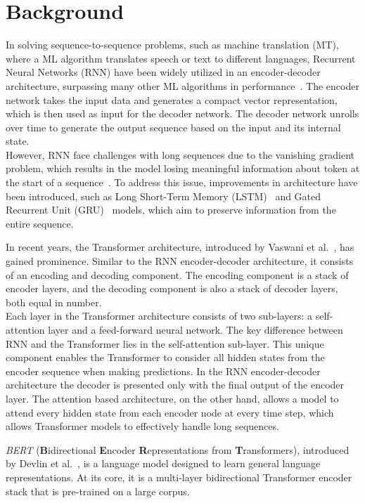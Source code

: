 \chapter{Background}\label{chap:background}
In solving sequence-to-sequence problems, such as machine translation (MT), where a ML algorithm translates speech or text to different languages, Recurrent Neural Networks (RNN) have been widely utilized in an encoder-decoder architecture, surpassing many other ML algorithms in performance~\cite{cho2014properties}. The encoder network takes the input data and generates a compact vector representation, which is then used as input for the decoder network. The decoder network unrolls over time to generate the output sequence based on the input and its internal state.\\
However, RNN face challenges with long sequences due to the vanishing gradient problem, which results in the model losing meaningful information about token at the start of a sequence~\cite{hochreiter1998vanishing}. To address this issue, improvements in architecture have been introduced, such as Long Short-Term Memory (LSTM)~\cite{hochreiter1997long} and Gated Recurrent Unit (GRU)~\cite{cho2014learning} models, which aim to preserve information from the entire sequence.\par
In recent years, the Transformer architecture, introduced by Vaswani et al.~\cite{vaswani2017attention}, has gained prominence. Similar to the RNN encoder-decoder architecture, it consists of an encoding and decoding component. The encoding component is a stack of encoder layers, and the decoding component is also a stack of decoder layers, both equal in number.\\
Each layer in the Transformer architecture consists of two sub-layers: a self-attention layer and a feed-forward neural network. The key difference between RNN and the Transformer lies in the self-attention sub-layer. This unique component enables the Transformer to consider all hidden states from the encoder sequence when making predictions. In the RNN encoder-decoder architecture the decoder is presented only with the final output of the encoder layer. The attention based architecture, on the other hand, allows a model to attend every hidden state from each encoder node at every time step, which allows Transformer models to effectively handle long sequences.\par
\textit{BERT} (\textbf{B}idirectional \textbf{E}ncoder \textbf{R}epresentations from \textbf{T}ransformers), introduced by Devlin et al.~\cite{devlin2019bert}, is a language model designed to learn general language representations. At its core, it is a multi-layer bidirectional Transformer encoder stack that is pre-trained on a large corpus.\\
